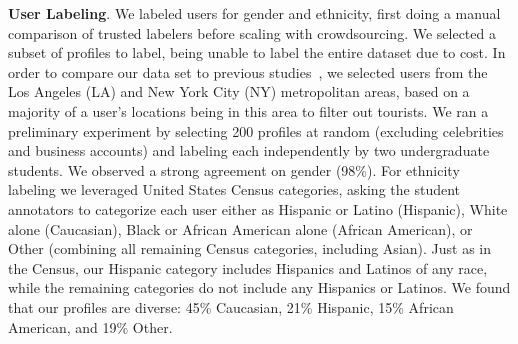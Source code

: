\textbf{User Labeling}.
We labeled users for gender and ethnicity, first doing a manual comparison of trusted labelers before scaling with crowdsourcing.
We selected a subset of profiles to label, being unable to label the entire dataset due to cost.
In order to compare our data set to previous studies~\cite{Isaacman:2011un,Isaacman:2011cn,Isaacman:2010en}, we selected users from the Los Angeles (LA) and New York City (NY) metropolitan areas, based on a majority of a user's locations being in this area to filter out tourists.
We ran a preliminary experiment by selecting 200 profiles at random (excluding celebrities and business accounts) and labeling each independently by two undergraduate students.
We observed a strong agreement on gender (98\%).
For ethnicity labeling we leveraged United States Census categories, asking the student annotators to categorize each user either as Hispanic or Latino (Hispanic), White alone (Caucasian), Black or African American alone (African American), or Other (combining all remaining Census categories, including Asian).
Just as in the Census, our Hispanic category includes Hispanics and Latinos of any race, while the remaining categories do not include any Hispanics or Latinos. 
We found that our profiles are diverse: 45\% Caucasian, 21\% Hispanic, 15\% African American, and 19\% Other.
